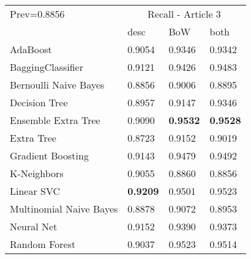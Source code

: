 \begin{tabular}{|l|l|l|l| }
\hline
Prev=0.8856 &  \multicolumn{3}{c|}{Recall - Article 3} \\
\cline{2-4} & desc & BoW & both \\ \hline
AdaBoost                & 0.9054 & 0.9346 & 0.9342\\
BaggingClassifier       & 0.9121 & 0.9426 & 0.9483\\
Bernoulli Naive Bayes   & 0.8856 & 0.9006 & 0.8895\\
Decision Tree           & 0.8957 & 0.9147 & 0.9346\\
Ensemble Extra Tree     & 0.9090 & {\bf 0.9532} & {\bf 0.9528}\\
Extra Tree              & 0.8723 & 0.9152 & 0.9019\\
Gradient Boosting       & 0.9143 & 0.9479 & 0.9492\\
K-Neighbors             & 0.9055 & 0.8860 & 0.8856\\
Linear SVC              & {\bf 0.9209} & 0.9501 & 0.9523\\
Multinomial Naive Bayes & 0.8878 & 0.9072 & 0.8953\\
Neural Net              & 0.9152 & 0.9390 & 0.9373\\
Random Forest           & 0.9037 & 0.9523 & 0.9514\\
\hline
\end{tabular}